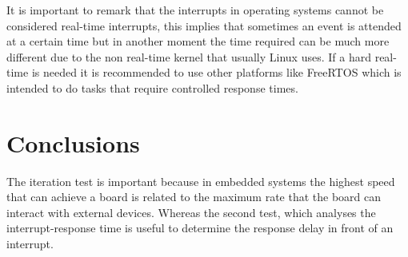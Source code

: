 It is important to remark that the interrupts in operating systems cannot be considered real-time interrupts, this implies that sometimes an event is attended at a certain time but in another moment the time required can be much more different due to the non real-time kernel that usually Linux uses. If a hard real-time is needed it is recommended to use other platforms like FreeRTOS which is intended to do tasks that require controlled response times.

\section{Conclusions}\label{S:PerformanceTests-Conclusions}
The iteration test is important because in embedded systems the highest speed that can achieve a board is related to the maximum rate that the board can interact with external devices. Whereas the second test, which analyses the interrupt-response time is useful to determine the response delay in front of an interrupt.